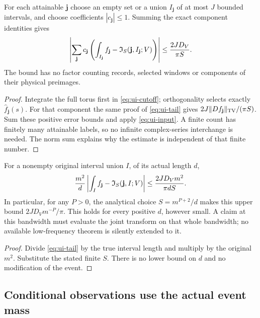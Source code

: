 \begin{corollary}
\label{cor:ui-all-labels}
For each attainable $\mathbf j$ choose an empty set or a union
$I_{\mathbf j}$ of at most $J$ bounded intervals, and choose
coefficients $|c_{\mathbf j}|\le1$.  Summing the exact component
identities gives
\begin{equation}\label{eq:ui-all-tail}
 \left|\sum_{\mathbf j}c_{\mathbf j}
       \left(\int_{I_{\mathbf j}}f_{\mathbf j}
           -\mathfrak I_S(\mathbf j,I_{\mathbf j};V)\right)\right|
 \le {2JD_V\over\pi S}.
\end{equation}
The bound has no factor counting records, selected windows or
components of their physical preimages.
\end{corollary}
\begin{proof}
Integrate the full torus first in \eqref{eq:ui-cutoff}; orthogonality
selects exactly $\widehat f_{\mathbf j}(s)$.  For that component the
same proof of \eqref{eq:ui-tail} gives
$2J\|Df_{\mathbf j}\|_{\rm TV}/(\pi S)$.  Sum these positive
error bounds and apply \eqref{eq:ui-input}.  A finite count has
finitely many attainable labels, so no infinite complex-series
interchange is needed.  The norm sum explains why the estimate is
independent of that finite number.
\end{proof}

\begin{corollary}
\label{cor:ui-normalization}
For a nonempty original interval union $I$, of its actual length $d$,
\begin{equation}\label{eq:ui-normalized-tail}
 {m^2\over d}
 \left|\int_I f_{\mathbf j}-\mathfrak I_S(\mathbf j,I;V)\right|
 \le {2JD_Vm^2\over\pi dS}.
\end{equation}
In particular, for any $P>0$, the analytical choice
$S=m^{P+2}/d$ makes this upper bound
$2JD_Vm^{-P}/\pi$.  This holds for every positive $d$, however
small.  A claim at this bandwidth must evaluate the joint transform
on that whole bandwidth; no available low-frequency theorem is
silently extended to it.
\end{corollary}
\begin{proof}
Divide \eqref{eq:ui-tail} by the true interval length and multiply by
the original $m^2$.  Substitute the stated finite $S$.  There is no
lower bound on $d$ and no modification of the event.
\end{proof}

\subsection{Conditional observations use the actual event mass}

